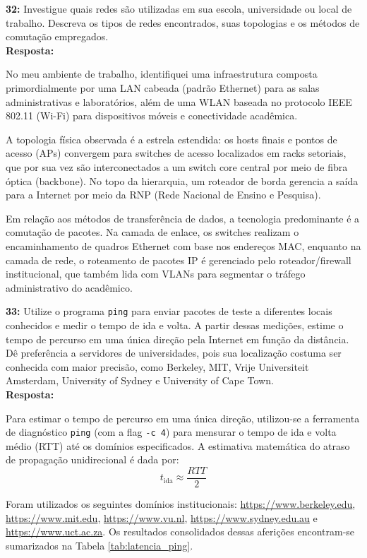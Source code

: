 \documentclass[12pt,a4paper]{report}
\begin{document}
\vspace{0.6cm}

\noindent \textbf{32:} Investigue quais redes são utilizadas em sua escola, universidade ou local de trabalho. Descreva os tipos de redes encontrados, suas topologias e os métodos de comutação empregados. \\
\textbf{Resposta:}

No meu ambiente de trabalho, identifiquei uma infraestrutura composta primordialmente por uma LAN cabeada (padrão Ethernet) para as salas administrativas e laboratórios, além de uma WLAN baseada no protocolo IEEE 802.11 (Wi-Fi) para dispositivos móveis e conectividade acadêmica.

A topologia física observada é a estrela estendida: os hosts finais e pontos de acesso (APs) convergem para switches de acesso localizados em racks setoriais, que por sua vez são interconectados a um switch core central por meio de fibra óptica (backbone). No topo da hierarquia, um roteador de borda gerencia a saída para a Internet por meio da RNP (Rede Nacional de Ensino e Pesquisa).

Em relação aos métodos de transferência de dados, a tecnologia predominante é a comutação de pacotes. Na camada de enlace, os switches realizam o encaminhamento de quadros Ethernet com base nos endereços MAC, enquanto na camada de rede, o roteamento de pacotes IP é gerenciado pelo roteador/firewall institucional, que também lida com VLANs para segmentar o tráfego administrativo do acadêmico.
\vspace{0.6cm}

\noindent \textbf{33:} Utilize o programa \texttt{ping} para enviar pacotes de teste a diferentes locais conhecidos e medir o tempo de ida e volta. A partir dessas medições, estime o tempo de percurso em uma única direção pela Internet em função da distância. Dê preferência a servidores de universidades, pois sua localização costuma ser conhecida com maior precisão, como Berkeley, MIT, Vrije Universiteit Amsterdam, University of Sydney e University of Cape Town. \\
\textbf{Resposta:}

Para estimar o tempo de percurso em uma única direção, utilizou-se a ferramenta de diagnóstico \texttt{ping} (com a flag \texttt{-c 4}) para mensurar o tempo de ida e volta médio (RTT) até os domínios especificados. A estimativa matemática do atraso de propagação unidirecional é dada por:
\[
    t_{\text{ida}} \approx \frac{RTT}{2}
\]

Foram utilizados os seguintes domínios institucionais: \url{https://www.berkeley.edu}, \url{https://www.mit.edu}, \url{https://www.vu.nl}, \url{https://www.sydney.edu.au} e \url{https://www.uct.ac.za}. Os resultados consolidados dessas aferições encontram-se sumarizados na Tabela \ref{tab:latencia_ping}.
\end{document}
